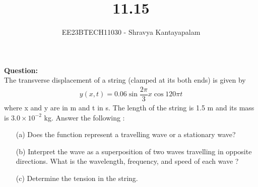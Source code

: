 \documentclass[journal,12pt,twocolumn]{IEEEtran}
\theoremstyle{remark}
\begin{document}
\title{11.15}
\author{EE23BTECH11030 - Shravya Kantayapalam}
\maketitle
\newpage
\bigskip

\renewcommand{\thefigure}{\theenumi}
\renewcommand{\thetable}{\theenumi}

\textbf{Question:}\\
The transverse displacement of a string (clamped at its both ends) is given by
\begin{align}
y(x, t) = 0.06 \sin{\dfrac{2\pi}{3}x} \cos{120 \pi t}
\end{align}
where x and y are in m and t in s. The length of the string is 1.5 m and its mass is
$3.0 \times 10^{-2}$ kg.
Answer the following :
\begin{enumerate}
	\item[(a)] Does the function represent a travelling wave or a stationary wave?
	\item[(b)] Interpret the wave as a superposition of two waves travelling in opposite directions. What is the wavelength, frequency, and speed of each wave ?
	\item[(c)] Determine the tension in the string.\\
\end{enumerate}
\end{document}
